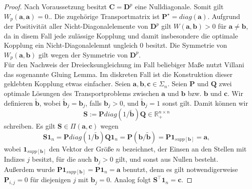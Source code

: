 \documentclass[twoside, 12pt,a4paper]{book}
\numberwithin{equation}{section}
\begin{document}
	\begin{proof}
		Nach Voraussetzung besitzt $\boldsymbol{C} = \boldsymbol{D}^p$ eine Nulldiagonale. Somit gilt $W_p(\boldsymbol{a},\boldsymbol{a}) =0.$. Die zugehörige Transportmatrix ist $\boldsymbol{P}^\star = diag(\boldsymbol{a})$. Aufgrund der Positivität aller Nicht-Diagonalelemente von $\boldsymbol{D}^p$ gilt $W(\boldsymbol{a},\boldsymbol{b}) > 0 $ für $\boldsymbol{a} \neq \boldsymbol{b}$, da in disem Fall jede zulässige Kopplung und damit insbesondere die optimale Kopplung ein Nicht-Diagonalelemnt ungleich $0$ besitzt. Die Symmetrie von $W_p(\boldsymbol{a},\boldsymbol{b})$ gilt wegen der Symmetrie von $\boldsymbol{D}^p$.\\
		
		\noindent Für den Nachweis der Dreiecksungleichung im Fall beliebiger Maße nutzt Villani \cite{villani2003topics} das sogenannte Gluing Lemma. Im diskreten Fall ist die Konstruktion dieser geklebten Kopplung etwas einfacher. Seien $\boldsymbol{a}, \boldsymbol{b}, \boldsymbol{c} \in \Sigma_n$. Seien $\boldsymbol{P}$ und $\boldsymbol{Q}$ zwei optimale Lösungen des Transportproblems zwischen $\boldsymbol{a}$ und $\boldsymbol{b}$ bzw. $\boldsymbol{b}$ und $\boldsymbol{c}$.
		Wir definieren $\tilde{\boldsymbol{b}}$, wobei $\tilde{\boldsymbol{b}}_j = \boldsymbol{b}_j$, falls $\boldsymbol{b}_j > 0$, und $\tilde{\boldsymbol{b}}_j = 1$ sonst gilt. Damit können wir 
		\begin{equation}
		\boldsymbol{S}:= \boldsymbol{P} diag(1/\tilde{\boldsymbol{b}})\boldsymbol{Q} \in \mathbb{R}_+^{n\times n}
		\end{equation}
		schreiben. Es gilt $\boldsymbol{S} \in \Pi (\boldsymbol{a}, \boldsymbol{c})$ wegen
		\begin{equation}
		\boldsymbol{S}\boldsymbol{1}_n = \boldsymbol{P} diag(1/\tilde{\boldsymbol{b}})\boldsymbol{Q}\boldsymbol{1}_n = \boldsymbol{P}(\boldsymbol{b}/\tilde{\boldsymbol{b}}) = \boldsymbol{P}\boldsymbol{1}_{supp[\boldsymbol{b}]} = \boldsymbol{a},	 	\end{equation}
		wobei $\boldsymbol{1}_{supp[\boldsymbol{b}]}$ den Vektor der Größe $n$ bezeichnet, der Einsen an den Stellen mit Indizes $j$ besitzt, für die auch $\boldsymbol{b}_j >0$ gilt, und sonst aus Nullen besteht.
		Außerdem wurde $\boldsymbol{P}\boldsymbol{1}_{supp[\boldsymbol{b}]} = \boldsymbol{P}\boldsymbol{1}_n = \boldsymbol{a}$ benutzt, denn es gilt notwendigerweise $\boldsymbol{P}_{i,j} = 0$ für diejenigen $j$ mit $\boldsymbol{b}_j = 0$. Analog folgt $\boldsymbol{S}^\top\boldsymbol{1}_n = \boldsymbol{c}$.
		

\end{proof}
\end{document}
